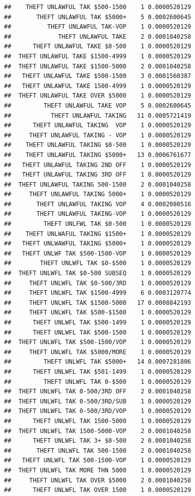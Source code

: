 \documentclass[]{book}
\begin{document}
\begin{verbatim}
##    THEFT UNLAWFUL TAK $500-1500    1 0.0000520129
##       THEFT UNLAWFUL TAK $5000+    5 0.0002600645
##          THEFT UNLAWFUL TAK-VOP    1 0.0000520129
##             THEFT UNLAWFUL TAKE    2 0.0001040258
##      THEFT UNLAWFUL TAKE $0-500    1 0.0000520129
##  THEFT UNLAWFUL TAKE $1500-4999    1 0.0000520129
##  THEFT UNLAWFUL TAKE $1500-5000    2 0.0001040258
##   THEFT UNLAWFUL TAKE $500-1500    3 0.0001560387
##   THEFT UNLAWFUL TAKE 1500-4999    1 0.0000520129
##  THEFT UNLAWFUL TAKE OVER $5000    1 0.0000520129
##         THEFT UNLAWFUL TAKE VOP    5 0.0002600645
##           THEFT UNLAWFUL TAKING   11 0.0005721419
##      THEFT UNLAWFUL TAKING  VOP    1 0.0000520129
##     THEFT UNLAWFUL TAKING - VOP    1 0.0000520129
##    THEFT UNLAWFUL TAKING $0-500    1 0.0000520129
##    THEFT UNLAWFUL TAKING $5000+   13 0.0006761677
##   THEFT UNLAWFUL TAKING 2ND OFF    1 0.0000520129
##   THEFT UNLAWFUL TAKING 3RD OFF    1 0.0000520129
##  THEFT UNLAWFUL TAKING 500-1500    2 0.0001040258
##     THEFT UNLAWFUL TAKING 5000+    1 0.0000520129
##       THEFT UNLAWFUL TAKING VOP    4 0.0002080516
##       THEFT UNLAWFUL TAKING-VOP    1 0.0000520129
##         THEFT UNLFWL TAK $0-500    1 0.0000520129
##    THEFT UNLWAFUL TAKING $1500+    1 0.0000520129
##   THEFT UNLWAWFUL TAKING $5000+    1 0.0000520129
##   THEFT UNLWF TAK $500-1500-VOP    1 0.0000520129
##        THEFT UNLWFL TAK $0-$500    1 0.0000520129
##  THEFT UNLWFL TAK $0-500 SUBSEQ    1 0.0000520129
##     THEFT UNLWFL TAK $0-500/3RD    1 0.0000520129
##     THEFT UNLWFL TAK $1500-4999    6 0.0003120774
##     THEFT UNLWFL TAK $1500-5000   17 0.0008842193
##     THEFT UNLWFL TAK $500-$1500    1 0.0000520129
##      THEFT UNLWFL TAK $500-1499    1 0.0000520129
##      THEFT UNLWFL TAK $500-1500    1 0.0000520129
##  THEFT UNLWFL TAK $500-1500/VOP    1 0.0000520129
##     THEFT UNLWFL TAK $5000/MORE    1 0.0000520129
##         THEFT UNLWFL TAK $5000+   14 0.0007281806
##      THEFT UNLWFL TAK $501-1499    1 0.0000520129
##         THEFT UNLWFL TAK 0-$500    1 0.0000520129
##  THEFT UNLWFL TAK 0-500/3RD OFF    2 0.0001040258
##  THEFT UNLWFL TAK 0-500/3RD/SUB    1 0.0000520129
##  THEFT UNLWFL TAK 0-500/3RD/VOP    1 0.0000520129
##      THEFT UNLWFL TAK 1500-5000    1 0.0000520129
##  THEFT UNLWFL TAK 1500-5000-VOP    2 0.0001040258
##      THEFT UNLWFL TAK 3+ $0-500    2 0.0001040258
##       THEFT UNLWFL TAK 500-1500    2 0.0001040258
##   THEFT UNLWFL TAK 500-1500-VOP    1 0.0000520129
##  THEFT UNLWFL TAK MORE THN 5000    1 0.0000520129
##     THEFT UNLWFL TAK OVER $5000    2 0.0001040258
##      THEFT UNLWFL TAK OVER 1500    1 0.0000520129

\end{verbatim}
\end{document}
